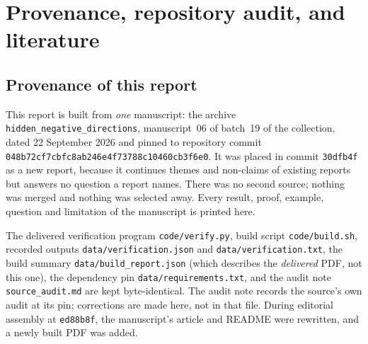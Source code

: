 \documentclass[11pt,oneside]{article}
\theoremstyle{definition}
\theoremstyle{remark}
\newcommand{\repo}[1]{\nolinkurl{#1}}%
\begin{document}
\appendix
\section{Provenance, repository audit, and literature}\label{hnd:app:audit}

\subsection{Provenance of this report}\label{hnd:app:provenance}

This report is built from \emph{one} manuscript: the archive
\texttt{hidden\_negative\_directions}, manuscript~06 of batch~19 of the
collection, dated 22 September 2026 and pinned to repository commit
\nolinkurl{048b72cf7cbfc8ab246e4f73788c10460cb3f6e0}. It was placed in
commit \texttt{30dfb4f} as a new report, because it continues themes and
non-claims of existing reports but answers no question a report names.
There was no second source; nothing was merged and nothing was selected
away. Every result, proof, example, question and limitation of the
manuscript is printed here.

The delivered verification program \repo{code/verify.py}, build script
\repo{code/build.sh}, recorded outputs \repo{data/verification.json} and
\repo{data/verification.txt}, the build summary
\repo{data/build_report.json} (which describes the \emph{delivered} PDF, not
this one), the dependency pin \repo{data/requirements.txt}, and the audit
note \repo{source_audit.md} are kept byte-identical. The audit note
records the source's own audit at its pin; corrections are made here, not
in that file. During editorial assembly at \texttt{ed88b8f}, the
manuscript's article and README were rewritten, and a newly built PDF was added.
\end{document}
